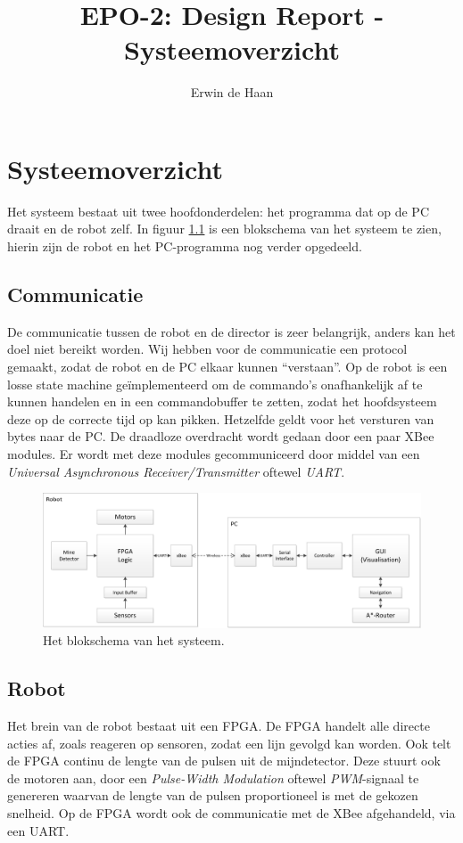 \documentclass{report}
\title{EPO-2: Design Report - Systeemoverzicht}
\author{Erwin de Haan}
\begin{document}
\chapter{Systeemoverzicht}
\label{ch:systeem}
Het systeem bestaat uit twee hoofdonderdelen: het programma dat op de PC draait en de robot zelf.
In figuur \ref{fig:topLevelSystem} is een blokschema van het systeem te zien, hierin zijn de robot en het PC-programma nog verder opgedeeld. 
\section{Communicatie}
De communicatie tussen de robot en de director is zeer belangrijk, anders kan het doel niet bereikt worden.
Wij hebben voor de communicatie een protocol gemaakt, zodat de robot en de PC elkaar kunnen ``verstaan''.
Op de robot is een losse state machine geïmplementeerd om de commando's onafhankelijk af te kunnen handelen en in een commandobuffer te zetten, zodat het hoofdsysteem deze op de correcte tijd op kan pikken.
Hetzelfde geldt voor het versturen van bytes naar de PC.
De draadloze overdracht wordt gedaan door een paar XBee modules.
Er wordt met deze modules gecommuniceerd door middel van een \textit{Universal Asynchronous Receiver/Transmitter} oftewel \textit{UART}.

\begin{figure}

\centering
\caption{Het blokschema van het systeem.}
\label{fig:topLevelSystem}
\includegraphics[width=\textwidth,angle=90]{top-level-system}

\end{figure}

\section{Robot}
Het brein van de robot bestaat uit een FPGA.
De FPGA handelt alle directe acties af, zoals reageren op sensoren, zodat een lijn gevolgd kan worden.
Ook telt de FPGA continu de lengte van de pulsen uit de mijndetector.
Deze stuurt ook de motoren aan, door een \textit{Pulse-Width Modulation} oftewel \textit{PWM}-signaal te genereren waarvan de lengte van de pulsen proportioneel is met de gekozen snelheid.
Op de FPGA wordt ook de communicatie met de XBee afgehandeld, via een UART.
\end{document}
